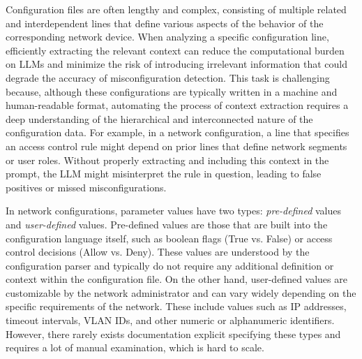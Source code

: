  \label{challenge_1} Configuration files
are often lengthy and complex, consisting of multiple related and
interdependent lines that define various aspects of the behavior of the
corresponding network device. When
analyzing a specific configuration line, efficiently
extracting the relevant context can reduce the computational burden on LLMs
and minimize the risk of introducing irrelevant information that could degrade
the accuracy of misconfiguration detection. This task is challenging because,
although these configurations are typically written in a machine and
human-readable format, automating the process of context extraction requires a
deep understanding of the hierarchical and interconnected nature of the
configuration data. For example, in a network configuration, a line that
specifies an access control rule might depend on prior lines that define
network segments or user roles. Without properly extracting and including this
context in the prompt, the LLM might misinterpret the rule in question, leading to false
positives or missed misconfigurations.


In network configurations, parameter values have two types: \textit{pre-defined} values and \textit{user-defined} values. Pre-defined values are those that are built into the configuration language itself, such as boolean flags (True vs. False) or access control decisions (Allow vs. Deny). These values are understood by the configuration parser and typically do not require any additional definition or context within the configuration file. On the other hand, user-defined values are customizable by the network administrator and can vary widely depending on the specific requirements of the network. These include values such as IP addresses, timeout intervals, VLAN IDs, and other numeric or alphanumeric identifiers.  However, there rarely exists documentation explicit specifying these types and requires a lot of manual examination, which is hard to scale.

